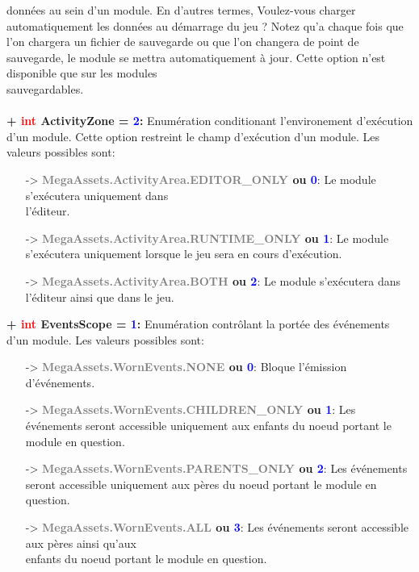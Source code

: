 \documentclass[a4paper, 11pt]{article}
\begin{document}
	données au sein d'un module. En d'autres termes, Voulez-vous charger automatiquement les données au
	démarrage du jeu ? Notez qu'a chaque fois que l'on chargera un fichier de sauvegarde ou que l'on
	changera de point de sauvegarde, le module se mettra automatiquement à jour. Cette option n'est
	disponible que sur les modules \\sauvegardables.\\\\
	\textbf{+ \textcolor{red}{int} ActivityZone = \textcolor{blue}{2}:} Enumération conditionant
	l'environement d'exécution d'un module. Cette option restreint le champ d'exécution d'un module. Les
	valeurs possibles sont:
	\begin{itemize}
		\item [-> \textbf{\textcolor{gray}{MegaAssets.ActivityArea.EDITOR\_ONLY} ou \textcolor{blue}{0}}:]
		Le module s'exécutera uniquement dans \\l'éditeur.
		\item [-> \textbf{\textcolor{gray}{MegaAssets.ActivityArea.RUNTIME\_ONLY} ou \textcolor{blue}{1}}:]
		Le module s'exécutera uniquement lorsque le jeu sera en cours d'exécution.
		\item [-> \textbf{\textcolor{gray}{MegaAssets.ActivityArea.BOTH} ou \textcolor{blue}{2}}:] Le module 
		s'exécutera dans l'éditeur ainsi que dans le jeu.\\
	\end{itemize}
	\textbf{+ \textcolor{red}{int} EventsScope = \textcolor{blue}{1}:} Enumération contrôlant la 
	portée des événements d'un module. Les valeurs possibles sont:
	\begin{itemize}
		\item [-> \textbf{\textcolor{gray}{MegaAssets.WornEvents.NONE} ou \textcolor{blue}{0}}:] Bloque
		l'émission d'événements.
		\item [-> \textbf{\textcolor{gray}{MegaAssets.WornEvents.CHILDREN\_ONLY} ou \textcolor{blue}{1}}:]
		Les événements seront accessible uniquement aux enfants du noeud portant le module en question.
		\item [-> \textbf{\textcolor{gray}{MegaAssets.WornEvents.PARENTS\_ONLY} ou \textcolor{blue}{2}}:]
		Les événements seront accessible uniquement aux pères du noeud portant le module en question.
		\item [-> \textbf{\textcolor{gray}{MegaAssets.WornEvents.ALL} ou \textcolor{blue}{3}}:] Les
		événements seront accessible aux pères ainsi qu'aux \\enfants du noeud portant le module en
		question.
	\end{itemize}
\end{document}
